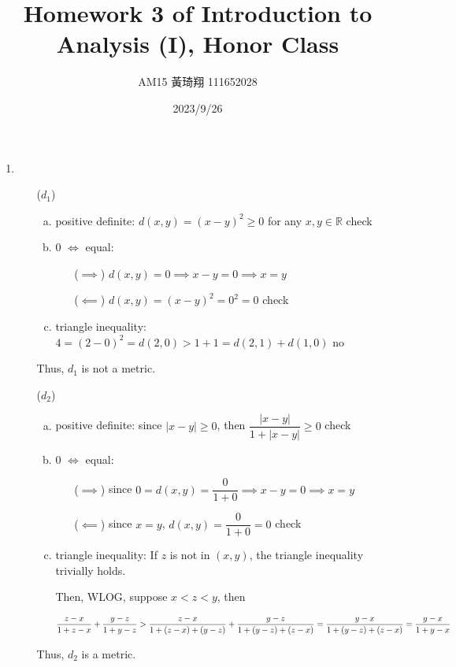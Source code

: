 \documentclass[12pt]{article}
\title{Homework 3 of Introduction to Analysis (I), Honor Class}
\author{AM15 黃琦翔 111652028}
\date{2023/9/26}
\begin{document}
\maketitle
\begin{enumerate}
    \item \begin{enumerate}
        \item[($d_1$)] \begin{enumerate}[a.]
            \item positive definite: $d(x, y) = (x-y)^2 \geq 0$ for any $x, y\in \mathbb{R}$ check
            \item 0 $\iff$ equal:\begin{enumerate}
                \item[($\implies$)] $d(x, y) = 0 \implies x - y = 0\implies x = y$
                \item[($\impliedby$)] $d(x, y) = (x-y)^2 = 0^2 = 0$ check
            \end{enumerate}
            \item triangle inequality: $4 = (2 - 0)^2 = d(2, 0) > 1 + 1 = d(2, 1) + d(1, 0)$ no
        \end{enumerate}
        Thus, $d_1$ is not a metric.
        
        \item[($d_2$)] \begin{enumerate}[a.]
            \item positive definite: since $| x-y| \geq 0$, then $\dfrac{|x-y|}{1+|x-y|} \geq 0$ check
            \item 0 $\iff$ equal:\begin{enumerate}
                \item[($\implies$)] since $0 = d(x, y) = \dfrac{0}{1+0}\implies x-y = 0\implies x = y$
                \item[($\impliedby$)] since $x = y$, $d(x, y) = \dfrac{0}{1 + 0} = 0$ check
            \end{enumerate}
            \item triangle inequality: If $z$ is not in $(x, y)$, the triangle inequality trivially holds.
            
            Then, WLOG, suppose $x < z < y$, then 
            
            $\dfrac{z-x}{1 + z - x} + \dfrac{y-z}{1 + y - z} > \dfrac{z-x}{1 + (z-x) + (y-z)} + \dfrac{y-z}{1 + (y-z) + (z-x)}\\ = \dfrac{y-x}{1 + (y-z) + (z-x)} = \dfrac{y-x}{1 + y -x}$
        \end{enumerate}
        Thus, $d_2$ is a metric.
    \end{enumerate}


\end{enumerate}
\end{document}
